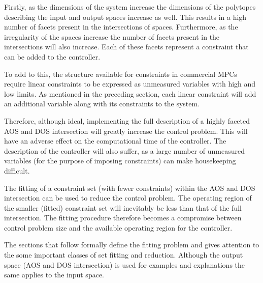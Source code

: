 Firstly, as the dimensions of the system increase the dimensions of the polytopes describing the input and output spaces increase as well.
This results in a high number of facets present in the intersections of spaces.
Furthermore, as the irregularity of the spaces increase the number of facets present in the intersections will also increase.
Each of these facets represent a constraint that can be added to the controller.

To add to this, the structure available for constraints in commercial MPCs require linear constraints to be expressed as unmeasured variables with high and low limits.
As mentioned in the preceding section, each linear constraint will add an additional variable along with its constraints to the system.

Therefore, although ideal, implementing the full description of a highly faceted AOS and DOS intersection will greatly increase the control problem.
This will have an adverse effect on the computational time of the controller.
The description of the controller will also suffer, as a large number of unmeasured variables (for the purpose of imposing constraints) can make housekeeping difficult.

The fitting of a constraint set (with fewer constraints) within the AOS and DOS intersection can be used to reduce the control problem.
The operating region of the smaller (fitted) constraint set will inevitably be less than that of the full intersection.
The fitting procedure therefore becomes a compromise between control problem size and the available operating region for the controller.

The sections that follow formally define the fitting problem and gives attention to the some important classes of set fitting and reduction.
Although the output space (AOS and DOS intersection) is used for examples and explanations the same applies to the input space.

